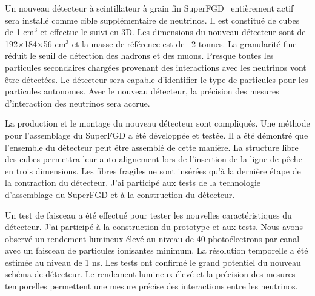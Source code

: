 \documentclass[../main.tex]{subfiles}
\begin{document}
Un nouveau détecteur à scintillateur à grain fin SuperFGD~\cite{Blondel2018} entièrement actif sera installé comme cible supplémentaire de neutrinos. Il est constitué de cubes de 1 cm${}^3$ et effectue le suivi en 3D. Les dimensions du nouveau détecteur sont de 192$\times$184$\times$56 cm${}^3$ et la masse de référence est de ~2 tonnes. La granularité fine réduit le seuil de détection des hadrons et des muons. Presque toutes les particules secondaires chargées provenant des interactions avec les neutrinos vont être détectées. Le détecteur sera capable d'identifier le type de particules pour les particules autonomes. Avec le nouveau détecteur, la précision des mesures d'interaction des neutrinos sera accrue.


La production et le montage du nouveau détecteur sont compliqués. Une méthode pour l'assemblage du SuperFGD a été développée et testée. Il a été démontré que l'ensemble du détecteur peut être assemblé de cette manière. La structure libre des cubes permettra leur auto-alignement lors de l'insertion de la ligne de pêche en trois dimensions. Les fibres fragiles ne sont insérées qu'à la dernière étape de la contraction du détecteur. J'ai participé aux tests de la technologie d'assemblage du SuperFGD et à la construction du détecteur.


Un test de faisceau a été effectué pour tester les nouvelles caractéristiques du détecteur. J'ai participé à la construction du prototype et aux tests. Nous avons observé un rendement lumineux élevé au niveau de 40 photoélectrons par canal avec un faisceau de particules ionisantes minimum. La résolution temporelle a été estimée au niveau de 1 ns. Les tests ont confirmé le grand potentiel du nouveau schéma de détecteur. Le rendement lumineux élevé et la précision des mesures temporelles permettent une mesure précise des interactions entre les neutrinos.
\end{document}
